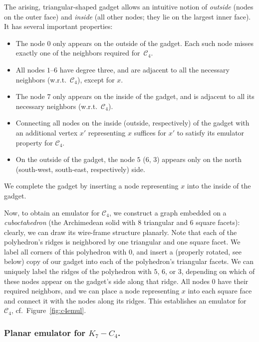 \documentclass[envcountsect,envcountsame]{llncs}
\renewenvironment{accumulate}{}{}
\newcommand{\KK}{\ensuremath{{K}_7 - C_4}\xspace}
\newcommand{\CC}{\ensuremath{\mathcal{C}_4}\xspace}
\begin{document}
\begin{accumulate}
The arising, triangular-shaped gadget
allows an intuitive notion of \emph{outside} (nodes on the outer face) and 
\emph{inside} (all other nodes; they lie on the largest inner face). It
has several important properties: 
\begin{itemize}
\item The node $0$ only appears on the outside of the gadget. Each such node 
misses exactly one of the neighbors required for~\CC.
\item All nodes $1$--$6$
have degree three, and are adjacent to all the necessary neighbors (w.r.t.\ \CC),
except for $x$.
\item The node $7$ only appears on the inside of the gadget, and is adjacent to
all its necessary neighbors (w.r.t.\ \CC). 
\item Connecting all nodes on the inside (outside, respectively) of the gadget 
with an additional vertex $x'$ representing $x$ suffices for $x'$ to satisfy
its emulator property for \CC.
\item On the outside of the gadget, the node $5$ ($6$, $3$) appears
only on the north (south-west, south-east, respectively) side.
\end{itemize}
We complete the gadget by inserting a node representing $x$ into the inside of 
the gadget.

Now, to obtain an emulator for \CC, we construct a graph embedded on a 
\emph{cuboctahedron} (the Archimedean solid with 8 triangular and 6 square 
facets): clearly, we can draw its wire-frame structure planarly.
Note that each of the polyhedron's ridges is neighbored by one triangular and 
one square facet.
We label all corners of this polyhedron with $0$, and insert a (properly rotated, 
see below) copy of our gadget into each of the polyhedron's triangular facets. 
We can uniquely label the ridges of the polyhedron with $5$, $6$, or $3$, depending
on which of these nodes appear on the gadget's side along that ridge. All nodes $0$ have their required neighbors, and we can place a node representing $x$ into each square face and
connect it with the nodes along its ridges. This establishes an emulator for $\CC$,
cf.\ Figure~\ref{fig:c4emul}.

\end{accumulate}



\subsubsection*{Planar emulator for \KK.}
\end{document}
